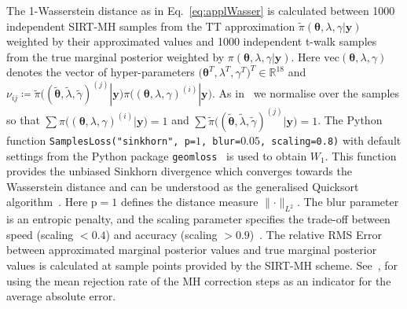 The 1-Wasserstein distance as in Eq.~\ref{eq:applWasser} is calculated between 1000 independent SIRT-MH samples from the TT approximation $\tilde{\pi}( \bm{\theta},\lambda,\gamma  | \bm{y})$ weighted by their approximated values and 1000 independent t-walk samples from the true marginal posterior weighted by $\pi( \bm{\theta},\lambda,\gamma  | \bm{y})$.
Here $\text{vec}( \bm{\theta},\lambda,\gamma )$ denotes the vector of hyper-parameters $\big( \bm{\theta}^T,\lambda^T,\gamma^T \big)^T \in \mathbb{R}^{18}$ and $\nu_{ij} \coloneqq  \tilde{\pi}\big( (\tilde{ \bm{\theta}},  \tilde{\lambda},  \tilde{\gamma})^{(j)}   | \bm{y}\big)  \pi\big( (\bm{\theta},\lambda,\gamma )^{(i)}  | \bm{y}\big) $.
As in~\cite{feydy2020OT} we normalise over the samples so that $\sum \pi\big( (\bm{\theta},\lambda,\gamma )^{(i)}  | \bm{y}\big)  = 1$ and $\sum \tilde{\pi}\big( (\tilde{ \bm{\theta}},  \tilde{\lambda},  \tilde{\gamma})^{(j)}   | \bm{y}\big) = 1$.
The Python function \texttt{SamplesLoss("sinkhorn", p=$1$, blur=$0.05$, scaling=0.8)} with default settings from the Python package \texttt{geomloss}~\cite{Wassersteinaccess} is used to obtain $W_1$.
This function provides the unbiased Sinkhorn divergence which converges towards the Wasserstein distance and can be understood as the generalised Quicksort algorithm~\cite{feydy2020OT}.
Here p$ = 1$ defines the distance measure $\lVert \cdot \rVert_{L^2}$.
The blur parameter is an entropic penalty, and the scaling parameter specifies the trade-off between speed (scaling $< 0.4$) and accuracy (scaling $>0.9$)~\cite{Wassersteinaccess}.
The relative RMS Error between approximated marginal posterior values and true marginal posterior values is calculated at sample points provided by the SIRT-MH scheme.
See~\cite{dolgov2020approximation}, for using the mean rejection rate of the MH correction steps as an indicator for the average absolute error.



